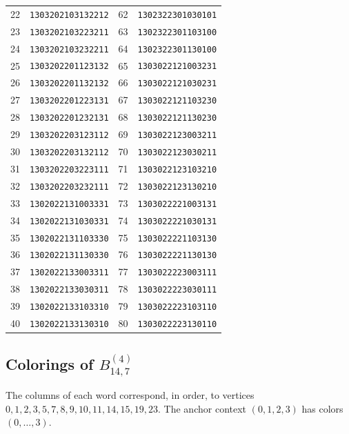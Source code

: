 \documentclass[aps,pra,reprint,superscriptaddress,longbibliography,nofootinbib,floatfix,10pt]{revtex4-2}
\theoremstyle{definition}
\begin{document}
\begin{longtable}{rl@{\qquad}rl}
22 & \texttt{1303202103132212} & 62 & \texttt{1302322301030101}\\
23 & \texttt{1303202103223211} & 63 & \texttt{1302322301103100}\\
24 & \texttt{1303202103232211} & 64 & \texttt{1302322301130100}\\
25 & \texttt{1303202201123132} & 65 & \texttt{1303022121003231}\\
26 & \texttt{1303202201132132} & 66 & \texttt{1303022121030231}\\
27 & \texttt{1303202201223131} & 67 & \texttt{1303022121103230}\\
28 & \texttt{1303202201232131} & 68 & \texttt{1303022121130230}\\
29 & \texttt{1303202203123112} & 69 & \texttt{1303022123003211}\\
30 & \texttt{1303202203132112} & 70 & \texttt{1303022123030211}\\
31 & \texttt{1303202203223111} & 71 & \texttt{1303022123103210}\\
32 & \texttt{1303202203232111} & 72 & \texttt{1303022123130210}\\
33 & \texttt{1302022131003331} & 73 & \texttt{1303022221003131}\\
34 & \texttt{1302022131030331} & 74 & \texttt{1303022221030131}\\
35 & \texttt{1302022131103330} & 75 & \texttt{1303022221103130}\\
36 & \texttt{1302022131130330} & 76 & \texttt{1303022221130130}\\
37 & \texttt{1302022133003311} & 77 & \texttt{1303022223003111}\\
38 & \texttt{1302022133030311} & 78 & \texttt{1303022223030111}\\
39 & \texttt{1302022133103310} & 79 & \texttt{1303022223103110}\\
40 & \texttt{1302022133130310} & 80 & \texttt{1303022223130110}\\
\end{longtable}\endgroup
{}\subsection{Colorings of \texorpdfstring{$B_{14,7}^{(4)}$}{gadget 4c}}
The columns of each word correspond, in order, to vertices $0,\allowbreak 1,\allowbreak 2,\allowbreak 3,\allowbreak 5,\allowbreak 7,\allowbreak 8,\allowbreak 9,\allowbreak 10,\allowbreak 11,\allowbreak 14,\allowbreak 15,\allowbreak 19,\allowbreak 23$. The anchor context $(0,1,2,3)$ has colors $(0,\ldots,3)$.
\end{document}
